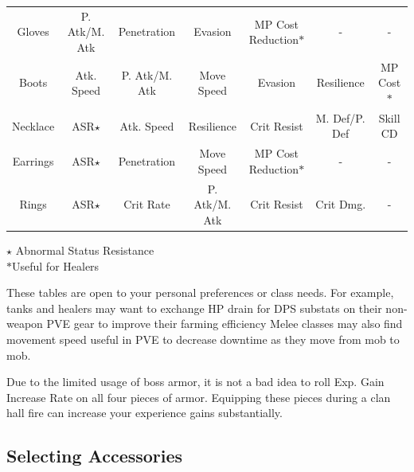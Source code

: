 \documentclass[]{article}
\begin{document}
\begin{center}
\begin{tabular}{|c|c|c|c|c|c|c|}
	Gloves & P. Atk/M. Atk & Penetration & Evasion & MP Cost Reduction$*$ & - & - \\ 
	Boots & Atk. Speed & P. Atk/M. Atk & Move Speed & Evasion & Resilience & MP Cost$*$ \\ 
	Necklace & ASR$\star$ & Atk. Speed & Resilience & Crit Resist & M. Def/P. Def & Skill CD \\ 
	Earrings & ASR$\star$ & Penetration & Move Speed & MP Cost Reduction$*$ & - & - \\ 
	Rings & ASR$\star$ & Crit Rate & P. Atk/M. Atk & Crit Resist & Crit Dmg. & - \\ 
	\hline 
\end{tabular} 

$\star$ Abnormal Status Resistance\\
$*$Useful for Healers
\end{center}
These tables are open to your personal preferences or class needs. 
For example, tanks and healers may want to exchange HP drain for DPS substats on their non-weapon PVE gear to improve their farming efficiency
Melee classes may also find movement speed useful in PVE to decrease downtime as they move from mob to mob.

Due to the limited usage of boss armor, it is not a bad idea to roll Exp. Gain Increase Rate on all four pieces of armor. Equipping these pieces during a clan hall fire can increase your experience gains substantially.
\subsection{Selecting Accessories}
\end{document}
